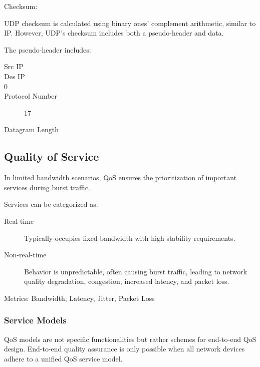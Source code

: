 \documentclass[11pt,journal,compsoc]{IEEEtran}
\begin{document}
Checksum:

UDP checksum is calculated using binary ones' complement arithmetic, similar to IP. However, UDP's checksum includes both a pseudo-header and data.

The pseudo-header includes:

\begin{description}
    \item[Src IP] 
    
    \item[Des IP] 
    
    \item[0] 
    
    \item[Protocol Number] 17
    
    \item[Datagram Length] 
\end{description}

\subsection{Quality of Service}

In limited bandwidth scenarios, QoS ensures the prioritization of important services during burst traffic.

Services can be categorized as:

\begin{description}
    \item[Real-time] Typically occupies fixed bandwidth with high stability requirements.
    
    \item[Non-real-time] Behavior is unpredictable, often causing burst traffic, leading to network quality degradation, congestion, increased latency, and packet loss.
\end{description}

Metrics: Bandwidth, Latency, Jitter, Packet Loss

\subsubsection{Service Models}

QoS models are not specific functionalities but rather schemes for end-to-end QoS design. End-to-end quality assurance is only possible when all network devices adhere to a unified QoS service model.
\end{document}
